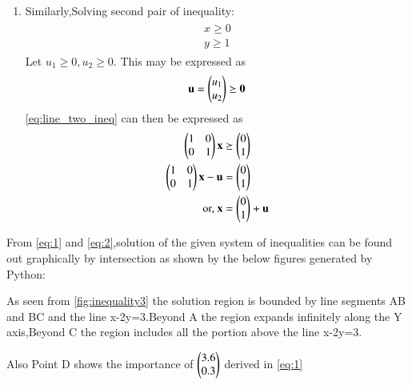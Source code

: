 \documentclass[journal,12pt,twocolumn]{IEEEtran}
\begin{document}
\begin{enumerate}
    \item Similarly,Solving second pair of inequality:
    \begin{align}
\label{eq:line_two_ineq}
\begin{split}
    x\geq 0
\\
    y \geq 1
\end{split}
\end{align}
\solution  Let $u_1 \ge 0, u_2 \ge 0$.  This may be expressed as
\begin{align}
\mathbf{u} = \begin{pmatrix}u_1\\u_2\end{pmatrix}\succeq \mathbf{0}
\end{align}
%
\eqref{eq:line_two_ineq} can then be expressed as
\begin{align}
\begin{pmatrix}1 & 0 \\ 0 & 1\end{pmatrix}\mathbf{x}  &\succeq \begin{pmatrix}0\\1\end{pmatrix}
\\
\begin{pmatrix}1 & 0 \\ 0 & 1\end{pmatrix}\mathbf{x}  -\mathbf{u}&=\begin{pmatrix}0\\1\end{pmatrix}
\\
\text{or, }
\mathbf{x} &= \begin{pmatrix}0\\1\end{pmatrix} +\mathbf{u}\label{eq:2}
\end{align}
\end{enumerate}
From \eqref{eq:1} and \eqref{eq:2},solution of the given system of inequalities can be found out graphically by intersection as shown by the below figures generated by Python:

As seen from \ref{fig:inequality3} the solution region is bounded by line segments AB and BC and the line x-2y=3.Beyond A the region expands infinitely along the Y axis,Beyond C the region includes all the portion above the line x-2y=3.

Also Point D shows the importance of $\begin{pmatrix}3.6\\0.3\end{pmatrix}$ derived in \eqref{eq:1}
\end{document}
